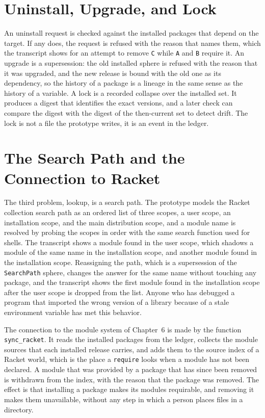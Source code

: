 \documentclass[11pt,oneside]{report}
\theoremstyle{plain}
\theoremstyle{definition}
\theoremstyle{remark}
\begin{document}
\section{Uninstall, Upgrade, and Lock}

An uninstall request is checked against the installed packages that depend on the target. If any does, the request is refused with the reason that names them, which the transcript shows for an attempt to remove \texttt{C} while \texttt{A} and \texttt{B} require it. An upgrade is a supersession: the old installed sphere is refused with the reason that it was upgraded, and the new release is bound with the old one as its dependency, so the history of a package is a lineage in the same sense as the history of a variable. A lock is a recorded collapse over the installed set. It produces a digest that identifies the exact versions, and a later check can compare the digest with the digest of the then-current set to detect drift. The lock is not a file the prototype writes, it is an event in the ledger.

\section{The Search Path and the Connection to Racket}

The third problem, lookup, is a search path. The prototype models the Racket collection search path as an ordered list of three scopes, a user scope, an installation scope, and the main distribution scope, and a module name is resolved by probing the scopes in order with the same search function used for shells. The transcript shows a module found in the user scope, which shadows a module of the same name in the installation scope, and another module found in the installation scope. Reassigning the path, which is a supersession of the \texttt{SearchPath} sphere, changes the answer for the same name without touching any package, and the transcript shows the first module found in the installation scope after the user scope is dropped from the list. Anyone who has debugged a program that imported the wrong version of a library because of a stale environment variable has met this behavior.

The connection to the module system of Chapter~6 is made by the function \texttt{sync\_racket}. It reads the installed packages from the ledger, collects the module sources that each installed release carries, and adds them to the source index of a Racket world, which is the place a \texttt{require} looks when a module has not been declared. A module that was provided by a package that has since been removed is withdrawn from the index, with the reason that the package was removed. The effect is that installing a package makes its modules requirable, and removing it makes them unavailable, without any step in which a person places files in a directory.
\end{document}
